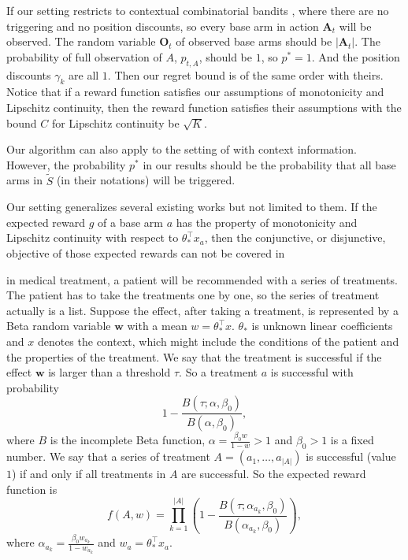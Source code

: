 \documentclass{article}
\newcommand{\bA}{\mathbf{A}}
\newcommand{\bO}{\mathbf{O}}
\newcommand{\bw}{\mathbf{w}}
\begin{document}
If our setting restricts to contextual combinatorial bandits \cite{qin2014contextual}, where there are no triggering and no position discounts, so every base arm in action $\bA_t$ will be observed. The random variable $\bO_t$ of observed base arms should be $|\bA_t|$. The probability of full observation of $A$, $p_{t, A}$, should be $1$, so $p^{\ast} = 1$. And the position discounts $\gamma_k$ are all $1$. Then our regret bound is of the same order with theirs. Notice that if a reward function satisfies our assumptions of monotonicity and Lipschitz continuity, then the reward function satisfies their assumptions with the bound $C$ for Lipschitz continuity be $\sqrt{K}$.

Our algorithm can also apply to the setting of \cite{chen2013combinatorial} with context information. However, the probability $p^{\ast}$ in our results should be the probability that all base arms in $\tilde{S}$ (in their notations) will be triggered.

Our setting generalizes several existing works but not limited to them.
If the expected reward $g$ of a base arm $a$ has the property of monotonicity and Lipschitz continuity with respect to $\theta_{\ast}^{\top}x_{a}$, then the conjunctive, or disjunctive, objective of those expected rewards can not be covered in 

in medical treatment, a patient will be recommended with a series of treatments. The patient has to take the treatments one by one, so the series of treatment actually is a list. Suppose the effect, after taking a treatment, is represented by a Beta random variable $\bw$ with a mean $w = \theta_*^{\top}x$. $\theta_*$ is unknown linear coefficients and $x$ denotes the context, which might include the conditions of the patient and the properties of the treatment. We say that the treatment is successful if the effect $\bw$ is larger than a threshold $\tau$. So a treatment $a$ is successful with probability
\begin{equation}
\label{eq:betaTau}
1 - \frac{B(\tau; \alpha, \beta_0)}{B(\alpha, \beta_0)},
\end{equation}
where $B$ is the incomplete Beta function, $\alpha = \frac{\beta_0 w}{1- w} > 1$ and $\beta_0 > 1$ is a fixed number. We say that a series of treatment $A = (a_1, \ldots, a_{|A|})$ is successful (value $1$) if and only if all treatments in $A$ are successful. So the expected reward function is
$$
f(A, w) = \prod_{k=1}^{|A|} (1 - \frac{B(\tau; \alpha_{a_k}, \beta_0)}{B(\alpha_{a_k}, \beta_0)}),
$$
where $\alpha_{a_k} = \frac{\beta_0 w_{a_k}}{1- w_{a_k}}$ and $w_a = \theta_*^{\top}x_{a}$.
\end{document}
